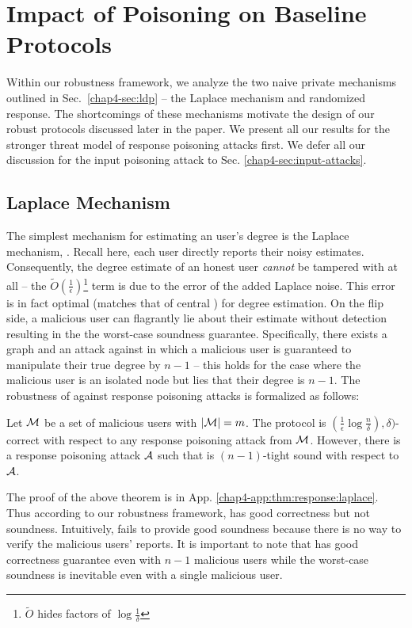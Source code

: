 \section{Impact of Poisoning on Baseline Protocols}

Within our robustness framework, we analyze the two naive private mechanisms outlined in Sec.~\ref{chap4-sec:ldp} -- the Laplace mechanism and randomized response. The shortcomings of these mechanisms motivate the design of our robust protocols discussed later in the paper. We present all our results for the stronger threat model of response poisoning attacks first. We defer all our discussion for the input poisoning attack to Sec. \ref{chap4-sec:input-attacks}. 

\subsection{Laplace Mechanism}

The simplest mechanism for estimating an user's degree is the Laplace mechanism, \RLap. Recall here, each user directly reports their noisy estimates. Consequently, the degree estimate of an honest user \textit{cannot} be tampered with at all -- the $\tilde{O}(\frac{1}{\epsilon})$\footnote{$\tilde{O}$ hides factors of $\log\frac{1}{\delta}$ } term is due to the error of the added Laplace noise. This error is in fact optimal (matches that of central \DP) for degree estimation.  On the flip side, a malicious user can flagrantly lie about their estimate without detection resulting in the the worst-case soundness guarantee. Specifically,  there
exists a graph and an attack against \RLap{} in
which a malicious user is guaranteed to manipulate their true degree by $n -1$ --
this holds for the case where the malicious user is an isolated node but
lies that their degree is $n - 1$. The robustness of \RLap{} against response poisoning attacks is formalized as follows: 
\begin{thm}\label{chap4-thm:response:laplace}
	Let $\mathcal{M}$ be a set of malicious users with $|\mathcal{M}| = m$. The \RLap{} protocol is $(\frac{1}{\epsilon}\log\frac{n}{\delta}),\delta)$-correct with respect to any response poisoning attack from $\mathcal{M}$. However, there is a response poisoning attack $\mathcal{A}$ such that \RLap{} is $(n-1)$-tight sound with respect to $\mathcal{A}$.
\end{thm}
The proof of the above theorem is in App. \ref{chap4-app:thm:response:laplace}.
Thus according to our robustness framework, \RLap{} has good correctness but not soundness. Intuitively, \RLap{} fails to provide good soundness because there is no way to verify the malicious users' reports. 
It is important to note that  \RLap{} has good correctness guarantee even with $n-1$ malicious users while the worst-case soundness is inevitable even with a single malicious user. 
